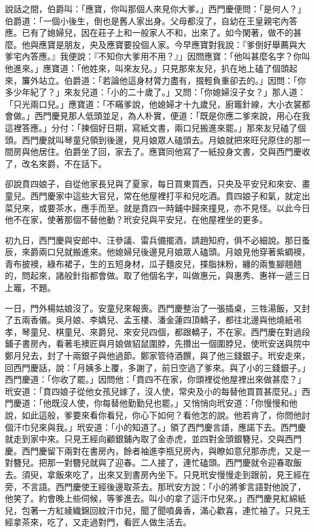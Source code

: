 \begin{showcontents}{}
說話之間，伯爵叫：「應寶，你叫那個人來見你大爹。」西門慶便問：「是何人？」伯爵道：「一個小後生，倒也是舊人家出身。父母都沒了，自幼在王皇親宅內答應。已有了媳婦兒，因在莊子上和一般家人不和，出來了。如今閑著，做不的甚麼。他與應寶是朋友，央及應寶要投個人家。今早應寶對我說：『爹倒好舉薦與大爹宅內答應。』我便說：『不知你大爹用不用？』」因問應寶：「他叫甚麼名字？你叫他進來。」應寶道：「他姓來，叫來友兒。」只見那來友兒，扒在地上磕了個頭起來，簾外站立。伯爵道：「若論他這身材膂力盡有，掇輕負重卻去的。」因問：「你多少年紀了？」來友兒道：「小的二十歲了。」又問：「你媳婦沒子女？」那人道：「只光兩口兒。」應寶道：「不瞞爹說，他媳婦才十九歲兒，廚竈針線，大小衣裳都會做。」西門慶見那人低頭並足，為人朴實，便道：「既是你應二爹來說，用心在我這裡答應。」分付：「揀個好日期，寫紙文書，兩口兒搬進來罷。」那來友兒磕了個頭。西門慶就叫琴童兒領到後邊，見月娘眾人磕頭去。月娘就把來旺兒原住的那一間房與他居住。伯爵坐了回，家去了。應寶同他寫了一紙投身文書，交與西門慶收了，改名來爵，不在話下。

卻說賁四娘子，自從他家長兒與了夏家，每日買東買西，只央及平安兒和來安、畫童兒。西門慶家中這些大官兒，常在他屋裡打平和兒吃酒。賁四娘子和氣，就定出菜兒來，或要茶水，應手而至。就是賁四一時鋪中歸來撞見，亦不見怪。以此今日他不在家，使著那個不替他動？玳安兒與平安兒，在他屋裡坐的更多。

初九日，西門慶與安郎中、汪參議、雷兵備擺酒，請趙知府，俱不必細說。那日蚤辰，來爵兩口兒就搬進來。他媳婦兒後邊見月娘眾人磕頭。月娘見他穿著紫綢襖，青布披襖，綠布裙子，生的五短身材，瓜子麵皮兒，搽脂抹粉，纏的兩隻腳翹翹的，問起來，諸般針指都會做。取了他個名字，叫做惠元，與惠秀、惠祥一遞三日上竈，不題。

一日，門外楊姑娘沒了。安童兒來報喪。西門慶整治了一張插桌，三牲湯飯，又封了五兩香儀。吳月娘、李嬌兒、孟玉樓、潘金蓮四頂轎子，都往北邊與他燒紙弔孝，琴童兒、棋童兒、來爵兒、來安兒四個，都跟轎子，不在家。西門慶在對過段鋪子書房內，看著毛襖匠與月娘做貂鼠圍脖，先攢出一個圍脖兒，使玳安送與院中鄭月兒去，封了十兩銀子與他過節。鄭家管待酒饌，與了他三錢銀子。玳安走來，回西門慶話，說：「月姨多上覆，多謝了，前日空過了爹來。與了小的三錢銀子。」西門慶道：「你收了罷。」因問他：「賁四不在家，你頭裡從他屋裡出來做甚麼？」玳安道：「賁四娘子從他女孩兒嫁了，沒人使，常央及小的每替他買買甚麼兒。」西門慶道：「他既沒人使，你每替他勤勤兒也罷。」又悄悄向玳安道：「你慢慢和他說，如此這般，爹要來看你看兒，你心下如何？看他怎的說。他若肯了，你問他討個汗巾兒來與我。」玳安道：「小的知道了。」領了西門慶言語，應諾下去。西門慶就走到家中來。只見王經向顧銀鋪內取了金赤虎，並四對金頭銀簪兒，交與西門慶。西門慶留下兩對在書房內，餘者袖進李瓶兒房內，與瞭如意兒那赤虎，又是一對簪兒。把那一對簪兒就與了迎春。二人接了，連忙磕頭。西門慶就令迎春取飯去。須臾，拿飯來吃了，出來又到書房內坐下。只見玳安慢慢走到跟前，見王經在旁，不言語。西門慶使王經後邊取茶去。那玳安方說：「小的將爹言語對他說了，他笑了。約會晚上些伺候，等爹進去。叫小的拿了這汗巾兒來。」西門慶見紅綿紙兒，包著一方紅綾織錦回紋汗巾兒，聞了聞噴鼻香，滿心歡喜，連忙袖了。只見王經拿茶來，吃了，又走過對門，看匠人做生活去。


\end{showcontents}
